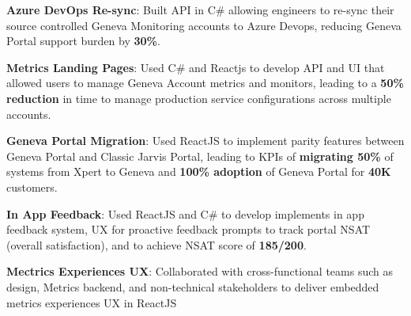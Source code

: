 \documentclass[letterpaper,11pt]{article}
\newcommand{\resumeItem}[2]{
  \item\small{
    \textbf{#1}{: #2 \vspace{-2pt}}
  }
}
\begin{document}
        
        \resumeItem{Azure DevOps Re-sync}{Built API in C\# allowing engineers to re-sync their source controlled Geneva Monitoring accounts to Azure Devops, reducing Geneva Portal support burden  by \textbf{30\%}.}

        \resumeItem{Metrics Landing Pages}{
        Used C\# and Reactjs to develop API and UI that allowed users to manage Geneva Account metrics and monitors, leading to a \textbf{50\% reduction} in time to manage production service configurations across multiple accounts.}


        \resumeItem{Geneva Portal Migration}{Used ReactJS to implement parity features  between Geneva Portal and Classic Jarvis Portal, leading to KPIs of \textbf{migrating 50\%} of systems from Xpert to Geneva and \textbf{100\% adoption} of Geneva Portal for \textbf{40K} customers.    
        }
        
       \resumeItem{In App Feedback}{Used ReactJS and C\# to develop implements in app feedback system, UX for proactive feedback prompts to track portal NSAT (overall satisfaction), and to achieve NSAT score of \textbf{185/200}.
        }

       \resumeItem{Mectrics Experiences UX}{Collaborated with cross-functional teams such as design, Metrics backend, and non-technical stakeholders to deliver embedded metrics experiences UX in ReactJS
       }



        
\end{document}
